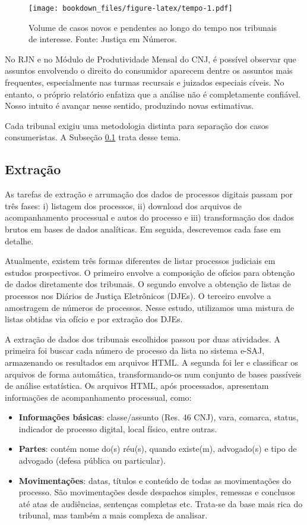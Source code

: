 \documentclass[]{report}
\providecommand{\tightlist}{%
  \setlength{\itemsep}{0pt}\setlength{\parskip}{0pt}}
\begin{document}
\begin{figure}[htbp]
\centering
\texttt{[image: bookdown\_files/figure-latex/tempo-1.pdf]}
\caption{\label{fig:tempo}Volume de casos novos e pendentes ao longo do
tempo nos tribunais de interesse. Fonte: Justiça em Números.}
\end{figure}

No RJN e no Módulo de Produtividade Mensal do CNJ, é possível observar
que assuntos envolvendo o direito do consumidor aparecem dentre os
assuntos mais frequentes, especialmente nas turmas recursais e juizados
especiais cíveis. No entanto, o próprio relatório enfatiza que a análise
não é completamente confiável. Nosso intuito é avançar nesse sentido,
produzindo novas estimativas.

Cada tribunal exigiu uma metodologia distinta para separação dos casos
consumeristas. A Subseção \ref{extracao} trata desse tema.

\subsection{Extração}\label{extracao}

As tarefas de extração e arrumação dos dados de processos digitais
passam por três fases: i) listagem dos processos, ii) download dos
arquivos de acompanhamento processual e autos do processo e iii)
transformação dos dados brutos em bases de dados analíticas. Em seguida,
descrevemos cada fase em detalhe.

Atualmente, existem três formas diferentes de listar processos judiciais
em estudos prospectivos. O primeiro envolve a composição de ofícios para
obtenção de dados diretamente dos tribunais. O segundo envolve a
obtenção de listas de processos nos Diários de Justiça Eletrônicos
(DJEs). O terceiro envolve a amostragem de números de processos. Nesse
estudo, utilizamos uma mistura de listas obtidas via ofício e por
extração dos DJEs.

A extração de dados dos tribunais escolhidos passou por duas atividades.
A primeira foi buscar cada número de processo da lista no sistema e-SAJ,
armazenando os resultados em arquivos HTML. A segunda foi ler e
classificar os arquivos de forma automática, transformando-os num
conjunto de bases passíveis de análise estatística. Os arquivos HTML,
após processados, apresentam informações de acompanhamento processual,
como:

\begin{itemize}
\tightlist
\item
  \textbf{Informações básicas}: classe/assunto (Res. 46 CNJ), vara,
  comarca, status, indicador de processo digital, local físico, entre
  outras.
\item
  \textbf{Partes}: contém nome do(s) réu(s), quando existe(m),
  advogado(s) e tipo de advogado (defesa pública ou particular).
\item
  \textbf{Movimentações}: datas, títulos e conteúdo de todas as
  movimentações do processo. São movimentações desde despachos simples,
  remessas e conclusos até atas de audiências, sentenças completas etc.
  Trata-se da base mais rica do tribunal, mas também a mais complexa de
  analisar.
\end{itemize}
\end{document}

